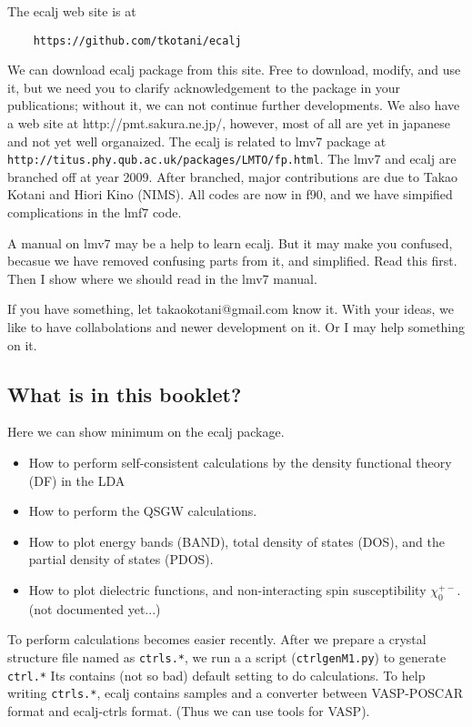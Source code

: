 \documentclass[a4paper,10pt,epsf,fleqn]{article}
\begin{document}
The ecalj web site is at 
\begin{verbatim}
    https://github.com/tkotani/ecalj
\end{verbatim}
We can download ecalj package from this site.
Free to download, modify, and use it, but we need you to clarify 
acknowledgement to the package in your publications; 
without it, we can not continue further developments.
We also have a web site at http://pmt.sakura.ne.jp/, 
however, most of all are yet in japanese and not yet well organaized.
The ecalj is related to lmv7 package at\\
\verb+http://titus.phy.qub.ac.uk/packages/LMTO/fp.html+. 
The lmv7 and ecalj are branched off at year 2009.
After branched, major contributions are due to Takao Kotani and Hiori
Kino (NIMS). All codes are now in f90, and we have simpified 
complications in the lmf7 code. 

A manual on lmv7 may be a help to learn ecalj. 
But it may make you confused, becasue we have removed confusing
parts from it, and simplified. Read this first. Then I show where we
should read in the lmv7 manual.

If you have something, let takaokotani@gmail.com know it.
With your ideas, we like to have collabolations and newer development on
it. Or I may help something on it.


\subsection{What is in this booklet?}
Here we can show minimum on the ecalj package.
\begin{itemize}
\item
How to perform self-consistent calculations by the density functional
theory (DF) in the LDA 
\item
How to perform the QSGW calculations.
\item
How to plot energy bands (BAND), total density of states
(DOS), and the partial density of states (PDOS).
\item
How to plot dielectric functions, and non-interacting spin
     susceptibility $\chi_0^{+-}$. (not documented yet...)
\end{itemize}

To perform calculations becomes easier recently.
After we prepare a crystal structure file named as \verb+ctrls.*+,
we run a a script (\verb+ctrlgenM1.py+) to generate \verb+ctrl.*+
Its contains (not so bad) default setting to do calculations.
To help writing \verb+ctrls.*+,  ecalj contains samples 
and a converter between VASP-POSCAR format and ecalj-ctrls format.
(Thus we can use tools for VASP).
\end{document}
